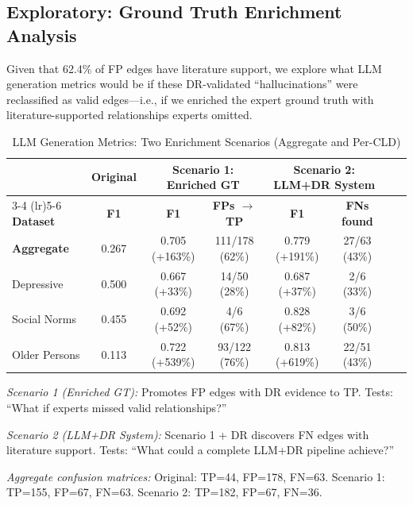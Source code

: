 \subsection{Exploratory: Ground Truth Enrichment Analysis}
\label{sec:gt_enrichment_results}

Given that 62.4\% of FP edges have literature support, we explore what LLM generation metrics would be if these DR-validated ``hallucinations'' were reclassified as valid edges---i.e., if we enriched the expert ground truth with literature-supported relationships experts omitted.

\begin{table}[H]
\centering
\caption{LLM Generation Metrics: Two Enrichment Scenarios (Aggregate and Per-CLD)}
\label{tab:enriched_gt}
\begin{threeparttable}
\footnotesize
\begin{tabular}{lccccccc}
\toprule
& \textbf{Original} & \multicolumn{2}{c}{\textbf{Scenario 1: Enriched GT}} & \multicolumn{2}{c}{\textbf{Scenario 2: LLM+DR System}} \\
\cmidrule(lr){3-4} \cmidrule(lr){5-6}
\textbf{Dataset} & \textbf{F1} & \textbf{F1} & \textbf{FPs $\to$ TP} & \textbf{F1} & \textbf{FNs found} \\
\midrule
\textbf{Aggregate} & 0.267 & 0.705 (+163\%) & 111/178 (62\%) & 0.779 (+191\%) & 27/63 (43\%) \\
\midrule
Depressive & 0.500 & 0.667 (+33\%) & 14/50 (28\%) & 0.687 (+37\%) & 2/6 (33\%) \\
Social Norms & 0.455 & 0.692 (+52\%) & 4/6 (67\%) & 0.828 (+82\%) & 3/6 (50\%) \\
Older Persons & 0.113 & 0.722 (+539\%) & 93/122 (76\%) & 0.813 (+619\%) & 22/51 (43\%) \\
\bottomrule
\end{tabular}
\begin{tablenotes}
\small
\item \textit{Scenario 1 (Enriched GT):} Promotes FP edges with DR evidence to TP. Tests: ``What if experts missed valid relationships?''
\item \textit{Scenario 2 (LLM+DR System):} Scenario 1 + DR discovers FN edges with literature support. Tests: ``What could a complete LLM+DR pipeline achieve?''
\item \textit{Aggregate confusion matrices:} Original: TP=44, FP=178, FN=63. Scenario 1: TP=155, FP=67, FN=63. Scenario 2: TP=182, FP=67, FN=36.
\end{tablenotes}
\end{threeparttable}
\end{table}

